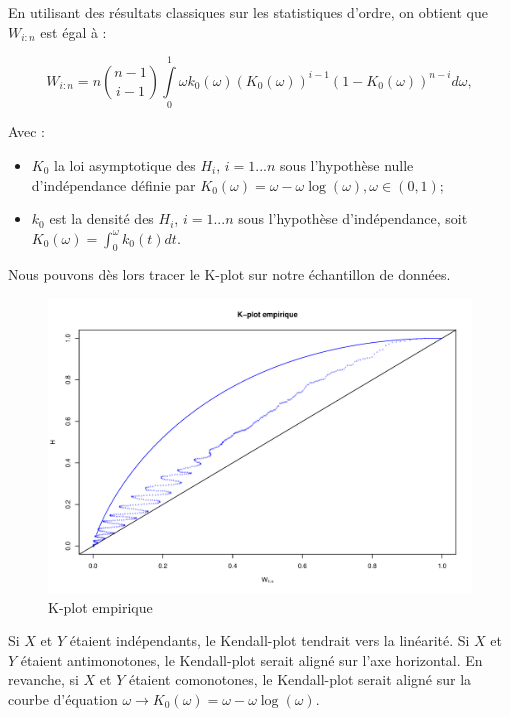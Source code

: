 En utilisant des résultats classiques sur les statistiques d’ordre, on obtient que $W_{i:n}$ est égal à :

$$
W_{i:n}= n {n-1 \choose i-1} \int\limits_{0}^1 \omega k_0(\omega) ( K_0(\omega) )^{i-1} ( 1-K_0(\omega) )^{n-i} d\omega, 
$$

Avec :

\begin{itemize}
\item $K_0$ la loi asymptotique des $H_i$, $i=1...n$ sous l’hypothèse nulle d’indépendance définie par $K_0(\omega) = \omega - \omega \operatorname{log} (\omega), \omega \in (0,1)$;
\item $k_0$ est la densité des $H_i$, $i=1...n$ sous l’hypothèse d’indépendance, soit $K_0(\omega) = \int_0^\omega k_0(t)dt$.
\end{itemize}

Nous pouvons dès lors tracer le K-plot sur notre échantillon de données.

\noindent%
\begin{figure}[H]
    \begin{center}
      \includegraphics[width=14 cm, angle=0]{./pictures/K_plot_empir.png}
      \centering\caption{K-plot empirique}
    \end{center}
\end{figure}

Si $X$ et $Y$ étaient indépendants, le Kendall-plot tendrait vers la linéarité.
Si $X$ et $Y$ étaient antimonotones, le Kendall-plot serait aligné sur l'axe horizontal.
En revanche, si $X$ et $Y$ étaient comonotones, le Kendall-plot serait aligné sur la courbe d’équation $\omega \longrightarrow K_0(\omega) = \omega - \omega \operatorname{log} (\omega)$.

